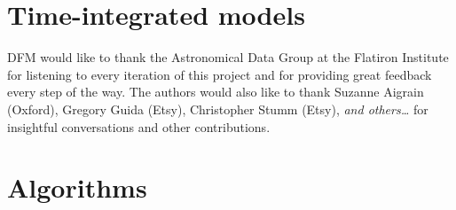\documentclass[modern]{aastex631}
\begin{document}
\section{Time-integrated models}



\begin{acknowledgments}
    DFM would like to thank the Astronomical Data Group at the Flatiron Institute for listening to every iteration of this project and for providing great feedback every step of the way.
    The authors would also like to thank
    Suzanne Aigrain (Oxford),
    Gregory Guida (Etsy),
    Christopher Stumm (Etsy),
    \emph{and others\ldots}
    for insightful conversations and other contributions.
\end{acknowledgments}


\appendix
\section{Algorithms}




\end{document}
